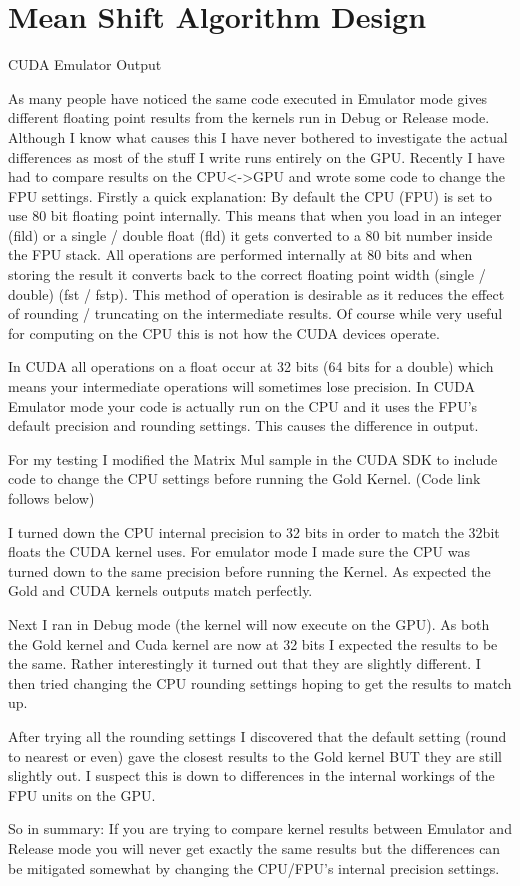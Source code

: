 \chapter{Mean Shift Algorithm Design} %
\label{cha:algorithm_design}


CUDA Emulator Output

As many people have noticed the same code executed in Emulator mode gives
different floating point results from the kernels run in Debug or Release mode.
Although I know what causes this I have never bothered to investigate the actual
differences as most of the stuff I write runs entirely on the GPU. Recently I
have had to compare results on the CPU<->GPU and wrote some code to change the
FPU settings. Firstly a quick explanation: By default the CPU (FPU) is set to
use 80 bit floating point internally. This means that when you load in an
integer (fild) or a single / double float (fld) it gets converted to a 80 bit
number inside the FPU stack. All operations are performed internally at 80 bits
and when storing the result it converts back to the correct floating point width
(single / double) (fst / fstp). This method of operation is desirable as it
reduces the effect of rounding / truncating on the intermediate results. Of
course while very useful for computing on the CPU this is not how the CUDA
devices operate.

 In \gls{CUDA} all operations on a float occur at 32 bits (64 bits for a double) which
means your intermediate operations will sometimes lose precision. In CUDA
Emulator mode your code is actually run on the CPU and it uses the FPU’s default
precision and rounding settings. This causes the difference in output.

 For my testing I modified the Matrix Mul sample in the \gls{CUDA} SDK to include code
to change the CPU settings before running the Gold Kernel. (Code link follows
below)

 I turned down the CPU internal precision to 32 bits in order to match the 32bit
floats the \gls{CUDA} kernel uses. For emulator mode I made sure the CPU was turned
down to the same precision before running the Kernel. As expected the Gold and
CUDA kernels outputs match perfectly.

 Next I ran in Debug mode (the kernel will now execute on the GPU). As both the
Gold kernel and Cuda kernel are now at 32 bits I expected the results to be the
same. Rather interestingly it turned out that they are slightly different. I
then tried changing the CPU rounding settings hoping to get the results to match
up.

 After trying all the rounding settings I discovered that the default setting
(round to nearest or even) gave the closest results to the Gold kernel BUT they
are still slightly out. I suspect this is down to differences in the internal
workings of the FPU units on the GPU.

 So in summary: If you are trying to compare kernel results between Emulator and
Release mode you will never get exactly the same results but the differences can
be mitigated somewhat by changing the CPU/FPU’s internal precision settings.
